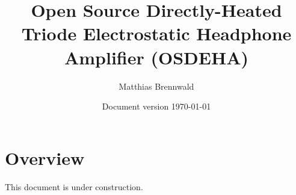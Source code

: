 


\title{Open Source Directly-Heated Triode Electrostatic Headphone Amplifier (OSDEHA)}
\author{Matthias Brennwald}
\date{Document version \today}



\twocolumn[\maketitle]

\section{Overview}
This document is under construction.


% 
% 


